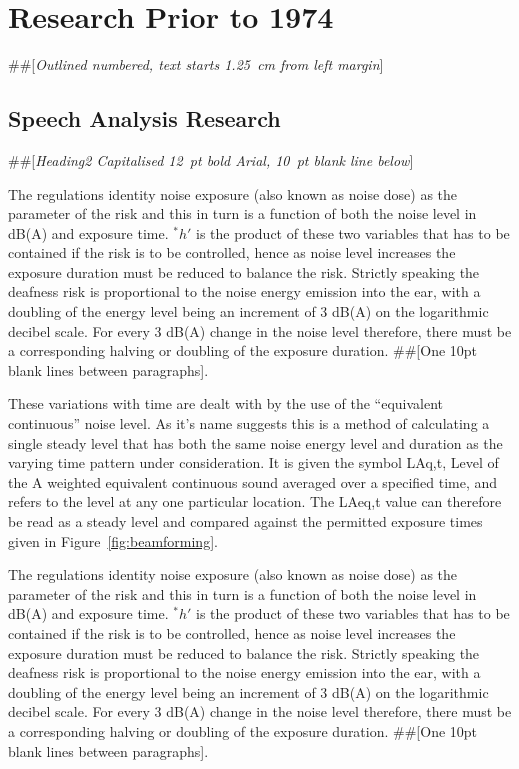 \documentclass[10pt, a4paper, oneside]{article}
\begin{document}
\section{Research Prior to 1974}

\#\#[\textit{Outlined numbered, text starts 1.25~cm from left margin}]

\subsection{Speech Analysis Research}

\#\#[\textit{Heading2 Capitalised 12~pt bold Arial, 10~pt blank line below}]

The regulations identity noise exposure (also known as noise dose) as the parameter of the risk and this in turn is a function of both the noise level in dB(A) and exposure time. $^*h'$ is the product of these two variables that has to be contained if the risk is to be controlled, hence as noise level increases the exposure duration must be reduced to balance the risk. Strictly speaking the deafness risk is proportional to the noise energy emission into the ear, with a doubling of the energy level being an increment of 3 dB(A) on the logarithmic decibel scale. For every 3 dB(A) change in the noise level therefore, there must be a corresponding halving or doubling of the exposure duration. \#\#[One 10pt blank lines between paragraphs].

These variations with time are dealt with by the use of the ``equivalent continuous'' noise level. As it's name suggests this is a method of calculating a single steady level that has both the same noise energy level and duration as the varying time pattern under consideration. It is given the symbol LAq,t, Level of the A weighted equivalent continuous sound averaged over a specified time, and refers to the level at any one particular location. The LAeq,t value can therefore be read as a steady level and compared against the permitted exposure times given in Figure~\ref{fig:beamforming}.

\clearpage
The regulations identity noise exposure (also known as noise dose) as the parameter of the risk and this in turn is a function of both the noise level in dB(A) and exposure time. $^*h'$ is the product of these two variables that has to be contained if the risk is to be controlled, hence as noise level increases the exposure duration must be reduced to balance the risk. Strictly speaking the deafness risk is proportional to the noise energy emission into the ear, with a doubling of the energy level being an increment of 3 dB(A) on the logarithmic decibel scale. For every 3 dB(A) change in the noise level therefore, there must be a corresponding halving or doubling of the exposure duration. \#\#[One 10pt blank lines between paragraphs].
\end{document}
